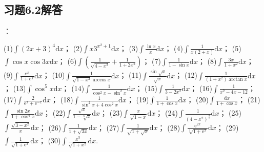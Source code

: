 \documentclass[12pt,UTF8]{ctexart}
\begin{document}
\subsection{习题6.2解答}
\begin{enumerate}
：
\begin{multicols}{2}
(1)$\int(2x+3)^4\mathrm dx$；
\newline
(2)$\int x3^{x^2+1}\mathrm dx$；
\newline
(3)$\int\frac{\ln x}x\mathrm dx$；
\newline
(4)$\int\frac1{x(2+x)}\mathrm dx$；
\newline
(5)$\int\cos x\cos3x\mathrm dx$；
\newline
(6)$\int(\frac1{\sqrt{4-x^2}}+\frac1{1+2x^2})$；
\newline
(7)$\int\frac1{1-\sin x}\mathrm dx$；
\newline
(8)$\int\frac{3x}{1+x^2}\mathrm dx$；
\newline
(9)$\int\frac{e^x}{1+e^x}\mathrm dx$；
\newline
(10)$\int\frac1{\sqrt{1-x^2}\arccos x}\mathrm dx$；
\newline
(11)$\int\frac{\sin\sqrt x}{\sqrt x}\mathrm dx$；
\newline
(12)$\int\frac1{(1+x^2)\arctan x}\mathrm dx$；
\newline
(13)$\int\cos^5x\mathrm dx$；
\newline
(14)$\int\frac1{\cos^2x-\sin^2x}\mathrm dx$；
\newline
(15)$\int\frac1{3-2x^2}\mathrm dx$；
\newline
(16)$\int\frac1{x^2-4x-12}$；
\newline
(17)$\int\frac2{\mathrm{e}^x+\mathrm{e}^{-x}}\mathrm dx$；
\newline
(18)$\int\frac1{\sin^2x+4\cos^2x}\mathrm dx$；
\newline
(19)$\int\frac1{1+\cos x}\mathrm dx$；
\newline
(20)$\int\frac{\mathrm dx}{1+\cos x}$；
\newline
(21)$\int\frac{\sin2x}{1+\cos^4x}\mathrm dx$；
\newline
(22)$\int\frac{\sqrt x}{1-\sqrt[3]x}\mathrm dx$；
\newline
(23)$\int\frac x{\sqrt{1-x}}\mathrm dx$；
\newline
(24)$\int\frac1{(4-x^2)^{\frac32}}\mathrm dx$；
\newline
(25)$\int\frac{\sqrt{3-x^2}}x\mathrm dx$；
\newline
(26)$\int\frac1{1+\sqrt{3x}}\mathrm dx$；
\newline
(27)$\int\frac1{\sqrt{1+\sqrt x}}\mathrm dx$；
\newline
(28)$\int\frac{\mathrm{e}^{2x}}{\sqrt[3]{1+\mathrm{e}^x}}\mathrm dx$；
\newline
(29)$\int\frac1{\sqrt{1+\mathrm e^x}}\mathrm dx$；
\newline
(30)$\int\frac{x^5}{\sqrt{1+x^2}}\mathrm dx$.
\end{multicols}


\end{enumerate}
\end{document}
